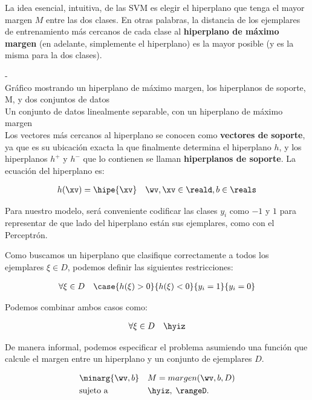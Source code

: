 

La idea esencial, intuitiva, de las SVM es elegir el hiperplano que tenga el mayor margen $M$ entre las dos clases. En otras palabras, la distancia de los ejemplares de entrenamiento más cercanos de cada clase al \textbf{hiperplano de máximo margen} (en adelante, simplemente el hiperplano) es la mayor posible (y es la misma para la dos clases).

-\\
Gráfico mostrando un hiperplano de máximo margen, los hiperplanos de soporte, M, y dos conjuntos de datos\\
Un conjunto de datos linealmente separable, con un hiperplano de máximo margen\\

Los vectores más cercanos al hiperplano se conocen como \textbf{vectores de soporte}, ya que es su ubicación exacta la que finalmente determina el hiperplano $h$, y los hiperplanos $h^{+}$  y $h^{-}$ que lo contienen se llaman \textbf{hiperplanos de soporte}. La ecuación del hiperplano es:


\begin{align}
h(\xv) = \hipe{\xv} \quad \wv, \xv \in \reald, b \in \reals
\end{align}

Para nuestro modelo, será conveniente codificar las clases $y_i$ como $-1$ y $1$ para representar de que lado del hiperplano están sus ejemplares, como con el Perceptrón.

Como buscamos un hiperplano que clasifique correctamente a todos los ejemplares $\xi \in D$, podemos definir las siguientes restricciones:

\begin{align}
\forall \xi \in D \quad \case{ h(\xi) >0 }{h(\xi) <0}{y_i=1}{y_i=0} 
\end{align}

Podemos combinar ambos casos como:

\begin{align}
\forall \xi \in D \quad \hyiz
\end{align}

De manera informal, podemos especificar el problema asumiendo una función que calcule el margen entre un hiperplano y un conjunto de ejemplares $D$.

\begin{equation*}
\begin{aligned}
& \minarg{\wv,b}
& & M=margen(\wv,b,D) \\
& \text{sujeto a}
& & \hyiz, \; \rangeD.
\end{aligned}
\end{equation*}

